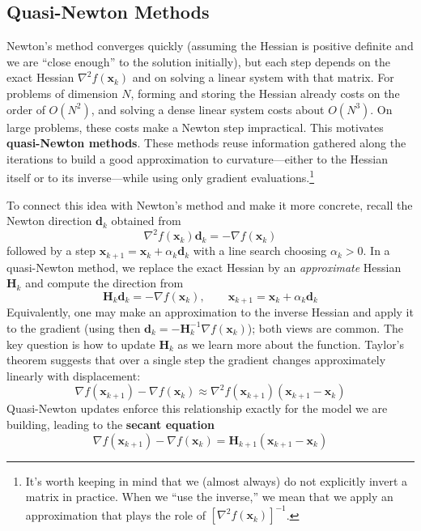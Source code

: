 
\subsection{Quasi-Newton Methods}
Newton's method converges quickly (assuming the Hessian is positive definite and we are ``close enough'' to the solution initially), but each step depends on the exact Hessian $\nabla^{2} f(\mathbf{x}_k)$ and on solving a linear system with that matrix. For problems of dimension $N$, forming and storing the Hessian already costs on the order of $O(N^{2})$, and solving a dense linear system costs about $O(N^{3})$. On large problems, these costs make a Newton step impractical. This motivates \textbf{quasi-Newton methods}. These methods reuse information gathered along the iterations to build a good approximation to curvature---either to the Hessian itself or to its inverse---while using only gradient evaluations.\footnote{It's worth keeping in mind that we (almost always) do not explicitly invert a matrix in practice. When we ``use the inverse,'' we mean that we apply an approximation that plays the role of $[\nabla^2 f(\mathbf{x}_k)]^{-1}$.}

To connect this idea with Newton's method and make it more concrete, recall the Newton direction $\mathbf{d}_k$ obtained from
\begin{equation}
\nabla^{2} f(\mathbf{x}_k) \mathbf{d}_k = -\nabla f(\mathbf{x}_k)
\end{equation}
followed by a step $\mathbf{x}_{k+1} = \mathbf{x}_k + \alpha_k \mathbf{d}_k$ with a line search choosing $\alpha_k>0$. In a quasi-Newton method, we replace the exact Hessian by an \emph{approximate} Hessian $\mathbf{H}_k$ and compute the direction from
\begin{equation}
\mathbf{H}_k \mathbf{d}_k = -\nabla f(\mathbf{x}_k), \qquad \mathbf{x}_{k+1} = \mathbf{x}_k + \alpha_k \mathbf{d}_k
\end{equation}
Equivalently, one may make an approximation to the inverse Hessian and apply it to the gradient (using then $\mathbf{d}_k = -\mathbf{H}_k^{-1} \nabla f(\mathbf{x}_k)$); both views are common. The key question is how to update $\mathbf{H}_k$ as we learn more about the function. Taylor's theorem suggests that over a single step the gradient changes approximately linearly with displacement:
\begin{equation}
\nabla f(\mathbf{x}_{k+1}) - \nabla f(\mathbf{x}_k) \approx \nabla^{2} f(\mathbf{x}_{k+1}) (\mathbf{x}_{k+1}-\mathbf{x}_k)
\end{equation}
Quasi-Newton updates enforce this relationship exactly for the model we are building, leading to the \textbf{secant equation}
\begin{equation}
    \nabla f(\mathbf{x}_{k+1}) - \nabla f(\mathbf{x}_k) = \mathbf{H}_{k+1} (\mathbf{x}_{k+1}-\mathbf{x}_k)
    \label{eq:secant_equation}
\end{equation}


